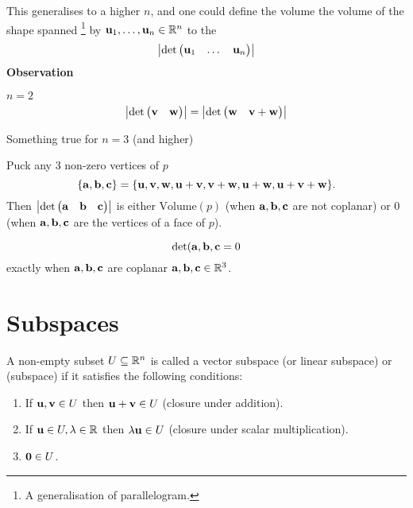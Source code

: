 \documentclass[10pt, a4paper]{article}
\begin{document}
This generalises to a higher $n$,
and one could define the volume the volume of the shape spanned
\footnote{A generalisation of parallelogram.}
by $\mathbf{u}_1, \dotsc, \mathbf{u}_n \in \mathbb{R} ^ n$ to the
\[
\left|\det\begin{pmatrix}
    \mathbf{u}_1 & \dotsc & \mathbf{u}_n
\end{pmatrix}\right|
\]
\textbf{Observation}

$n = 2$
\[
\left|\det\begin{pmatrix}
    \mathbf{v} & \mathbf{w}
\end{pmatrix}\right| = \left|\det\begin{pmatrix}
    \mathbf{w} & \mathbf{v} + \mathbf{w}
\end{pmatrix}\right|
\]

Something true for $n = 3$
(and higher)

Puck any $3$ non-zero vertices of $p$
\[
\{\mathbf{a}, \mathbf{b}, \mathbf{c}\} = \{\mathbf{u, v, w, u + v, v + w, u + w, u + v + w}\}.
\]
Then $\left|\det\begin{pmatrix}
    \mathbf{a} & \mathbf{b} & \mathbf{c}
\end{pmatrix}\right|$ is either $\mathrm{Volume}(p)$
(when $\mathbf{a, b, c}$ are not coplanar)
or $0$
(when $\mathbf{a, b, c}$ are the vertices of a face of $p$).

\[
\det(\mathbf{a, b, c} = 0
\]
exactly when $\mathbf{a, b, c}$ are coplanar $\mathbf{a, b, c} \in \mathbb{R} ^ 3$.

\newpage

\section{Subspaces}

\begin{definition}
    A non-empty subset $U \subseteq \mathbb{R} ^ n$ is called a vector subspace
    (or linear subspace)
    or
    (subspace)
    if it satisfies the following conditions:
    \begin{enumerate}[label = (\roman*)]
        \item If $\mathbf{u}, \mathbf{v} \in U$ then $\mathbf{u + v} \in U$
        (closure under addition).
        \item If $\mathbf{u} \in U, \lambda \in \mathbb{R}$ then $\lambda\mathbf{u} \in U$
        (closure under scalar multiplication).
        \item $\mathbf{0} \in U$.
    \end{enumerate}
\end{definition}
\end{document}

